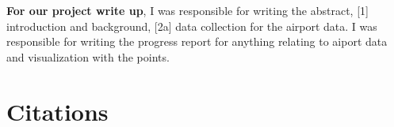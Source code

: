 \documentclass[9pt,twocolumn,twoside]{opticajnl}
\begin{document}
\textbf{For our project write up}, I was responsible for writing the abstract, [1] introduction and background, [2a] data collection for the airport data. I was responsible for writing the progress report for anything relating to aiport data and visualization with the points.

\section {Citations}










\end{document}
